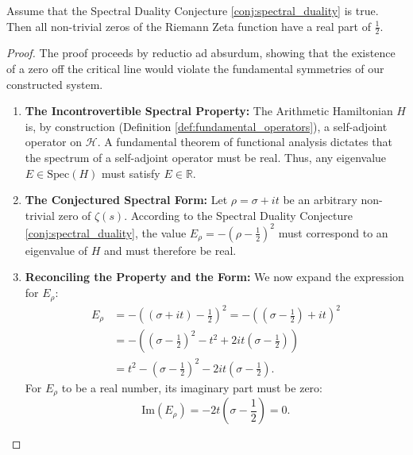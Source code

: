 \begin{theorem}
\label{thm:conditional_rh_symmetry}
Assume that the Spectral Duality Conjecture \ref{conj:spectral_duality} is true. Then all non-trivial zeros of the Riemann Zeta function have a real part of $\frac{1}{2}$.
\end{theorem}

\begin{proof}
The proof proceeds by reductio ad absurdum, showing that the existence of a zero off the critical line would violate the fundamental symmetries of our constructed system.

\begin{enumerate}[label=(\roman*), wide, labelindent=0pt]
    \item \textbf{The Incontrovertible Spectral Property:} The Arithmetic Hamiltonian $H$ is, by construction (Definition \ref{def:fundamental_operators}), a self-adjoint operator on $\mathcal{H}$. A fundamental theorem of functional analysis dictates that the spectrum of a self-adjoint operator must be real. Thus, any eigenvalue $E \in \mathrm{Spec}(H)$ must satisfy $E \in \mathbb{R}$.

    \item \textbf{The Conjectured Spectral Form:} Let $\rho = \sigma + it$ be an arbitrary non-trivial zero of $\zeta(s)$. According to the Spectral Duality Conjecture \ref{conj:spectral_duality}, the value $E_\rho = -(\rho - \frac{1}{2})^2$ must correspond to an eigenvalue of $H$ and must therefore be real.

    \item \textbf{Reconciling the Property and the Form:} We now expand the expression for $E_\rho$:
    \begin{align*}
        E_\rho &= -\left( (\sigma + it) - \frac{1}{2} \right)^2 = -\left( \left(\sigma - \frac{1}{2}\right) + it \right)^2 \\
             &= -\left( \left(\sigma - \frac{1}{2}\right)^2 - t^2 + 2it\left(\sigma - \frac{1}{2}\right) \right) \\
             &= t^2 - \left(\sigma - \frac{1}{2}\right)^2 - 2it\left(\sigma - \frac{1}{2}\right).
    \end{align*}
    For $E_\rho$ to be a real number, its imaginary part must be zero:
    \begin{equation}
        \mathrm{Im}(E_\rho) = -2t\left(\sigma - \frac{1}{2}\right) = 0.
    \end{equation}


\end{enumerate}
\end{proof}
